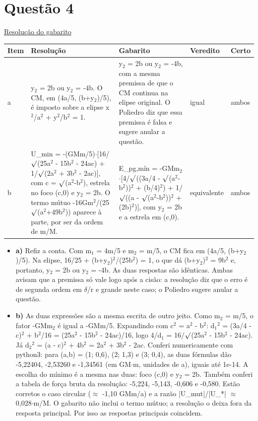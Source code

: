 \documentclass{article}%
\begin{document}
\section*{Questão 4}%
\href{https://poliedroresolve.sistemapoliedro.com.br/vestibulares/ita/2026/ita-2-fase-dia-3-30-10-2025-2-fase-dia-3/dissertativa-4-fisica-2-fase-dia-3-ita-2026}{Resolução do gabarito}\par\smallskip%
\begin{longtable}{@{}p{} p{} p{} p{} p{}@{}}\toprule Item & Resolução & Gabarito & Veredito & Certo \\ \midrule
a & y$_{2}$ = 2b ou y$_{2}$ = -4b. O CM, em (4a/5, (b+y$_{2}$)/5), é imposto sobre a elipse x$^2$/a$^2$ + y$^2$/b$^2$ = 1. & y$_{2}$ = 2b ou y$_{2}$ = -4b, com a mesma premissa de que o CM continua na elipse original. O Poliedro diz que essa premissa é falsa e sugere anular a questão. & igual & ambos \\
b & U\_min = -(GMm/5)$\cdot${[}16/$\surd$(25a$^2$ - 15b$^2$ - 24ac) + 1/$\surd$(2a$^2$ + 3b$^2$ - 2ac){]}, com c = $\surd$(a$^2$-b$^2$), estrela no foco (c,0) e y$_{2}$ = 2b. O termo mútuo -16Gm$^2$/(25$\surd$(a$^2$+49b$^2$)) aparece à parte, por ser da ordem de m/M. & E\_pg,mín = -GMm$_{2}$$\cdot${[}4/$\surd$((3a/4 - $\surd$(a$^2$-b$^2$))$^2$ + (b/4)$^2$) + 1/$\surd$((a - $\surd$(a$^2$-b$^2$))$^2$ + (2b)$^2$){]}, com y$_{2}$ = 2b e a estrela em (c,0). & equivalente & ambos \\
\bottomrule\end{longtable}%
\begin{itemize}%
\item%
\textbf{a)} Refiz a conta. Com m$_{1}$ = 4m/5 e m$_{2}$ = m/5, o CM fica em (4a/5, (b+y$_{2}$)/5). Na elipse, 16/25 + (b+y$_{2}$)$^2$/(25b$^2$) = 1, o que dá (b+y$_{2}$)$^2$ = 9b$^2$ e, portanto, y$_{2}$ = 2b ou y$_{2}$ = -4b. As duas respostas são idênticas. Ambas avisam que a premissa só vale logo após a cisão: a resolução diz que o erro é de segunda ordem em $\delta$/r e grande neste caso; o Poliedro sugere anular a questão.%
\item%
\textbf{b)} As duas expressões são a mesma escrita de outro jeito. Como m$_{2}$ = m/5, o fator -GMm$_{2}$ é igual a -GMm/5. Expandindo com c$^2$ = a$^2$ - b$^2$: d$_{1}$$^2$ = (3a/4 - c)$^2$ + b$^2$/16 = (25a$^2$ - 15b$^2$ - 24ac)/16, logo 4/d$_{1}$ = 16/$\surd$(25a$^2$ - 15b$^2$ - 24ac). Já d$_{2}$$^2$ = (a - c)$^2$ + 4b$^2$ = 2a$^2$ + 3b$^2$ - 2ac. Conferi numericamente com python3: para (a,b) = (1; 0,6), (2; 1,3) e (3; 0,4), as duas fórmulas dão -5,22404, -2,53260 e -1,34561 (em GM$\cdot$m, unidades de a), iguais até 1e-14. A escolha do mínimo é a mesma nas duas: foco (c,0) e y$_{2}$ = 2b. Também conferi a tabela de força bruta da resolução: -5,224, -5,143, -0,606 e -0,580. Estão corretos o caso circular ($\approx$ -1,10 GMm/a) e a razão |U\_mut|/|U\_*| $\approx$ 0,028$\cdot$m/M. O gabarito não inclui o termo mútuo; a resolução o deixa fora da resposta principal. Por isso as respostas principais coincidem.%
\end{itemize}%
\end{document}
